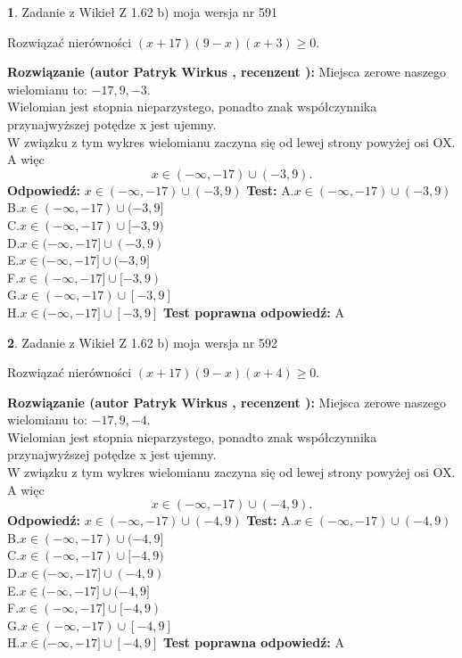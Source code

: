 \documentclass[12pt, a4paper]{article}
\theoremstyle{definition} %
\newtheorem{zad}{}
\newcommand{\zadStart}[1]{\begin{zad}#1\newline}
\newcommand{\zadStop}{\end{zad}}
\newcommand{\rozwStart}[2]{\noindent \textbf{Rozwiązanie (autor #1 , recenzent #2): }\newline}
\newcommand{\rozwStop}{\newline}
\newcommand{\odpStart}{\noindent \textbf{Odpowiedź:}\newline}
\newcommand{\odpStop}{\newline}
\newcommand{\testStart}{\noindent \textbf{Test:}\newline}
\newcommand{\testStop}{\newline}
\newcommand{\kluczStart}{\noindent \textbf{Test poprawna odpowiedź:}\newline}
\newcommand{\kluczStop}{\newline}
\begin{document}
\zadStart{Zadanie z Wikieł Z 1.62 b) moja wersja nr 591}

Rozwiązać nierówności $(x+17)(9-x)(x+3)\ge0$.
\zadStop
\rozwStart{Patryk Wirkus}{}
Miejsca zerowe naszego wielomianu to: $-17, 9, -3$.\\
Wielomian jest stopnia nieparzystego, ponadto znak współczynnika przy\linebreak najwyższej potędze x jest ujemny.\\ W związku z tym wykres wielomianu zaczyna się od lewej strony powyżej osi OX. A więc $$x \in (-\infty,-17) \cup (-3,9).$$
\rozwStop
\odpStart
$x \in (-\infty,-17) \cup (-3,9)$
\odpStop
\testStart
A.$x \in (-\infty,-17) \cup (-3,9)$\\
B.$x \in (-\infty,-17) \cup (-3,9]$\\
C.$x \in (-\infty,-17) \cup [-3,9)$\\
D.$x \in (-\infty,-17] \cup (-3,9)$\\
E.$x \in (-\infty,-17] \cup (-3,9]$\\
F.$x \in (-\infty,-17] \cup [-3,9)$\\
G.$x \in (-\infty,-17) \cup [-3,9]$\\
H.$x \in (-\infty,-17] \cup [-3,9]$
\testStop
\kluczStart
A
\kluczStop



\zadStart{Zadanie z Wikieł Z 1.62 b) moja wersja nr 592}

Rozwiązać nierówności $(x+17)(9-x)(x+4)\ge0$.
\zadStop
\rozwStart{Patryk Wirkus}{}
Miejsca zerowe naszego wielomianu to: $-17, 9, -4$.\\
Wielomian jest stopnia nieparzystego, ponadto znak współczynnika przy\linebreak najwyższej potędze x jest ujemny.\\ W związku z tym wykres wielomianu zaczyna się od lewej strony powyżej osi OX. A więc $$x \in (-\infty,-17) \cup (-4,9).$$
\rozwStop
\odpStart
$x \in (-\infty,-17) \cup (-4,9)$
\odpStop
\testStart
A.$x \in (-\infty,-17) \cup (-4,9)$\\
B.$x \in (-\infty,-17) \cup (-4,9]$\\
C.$x \in (-\infty,-17) \cup [-4,9)$\\
D.$x \in (-\infty,-17] \cup (-4,9)$\\
E.$x \in (-\infty,-17] \cup (-4,9]$\\
F.$x \in (-\infty,-17] \cup [-4,9)$\\
G.$x \in (-\infty,-17) \cup [-4,9]$\\
H.$x \in (-\infty,-17] \cup [-4,9]$
\testStop
\kluczStart
A
\kluczStop
\end{document}

